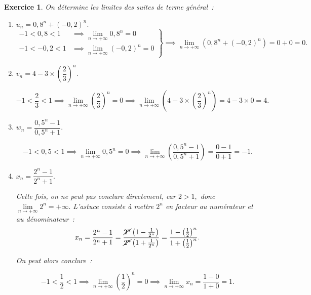 \documentclass[10pt]{article}
\newtheorem{exo}{Exercice}
\begin{document}
\begin{exo}

On détermine les limites des suites de terme général~:

\begin{enumerate}
\item $u_n=0,8^n+(-0,2)^n.$
\[
\left.
    \begin{array}{ll}
        -1<0,8<1&\implies \lim\limits_{n\to +\infty} 0,8^n = 0 \\
        -1<-0,2<1&\implies \lim\limits_{n\to +\infty} (-0,2)^n = 0
    \end{array}
\right \}\implies \lim\limits_{n\to +\infty}\left(0,8^n+(-0,2)^n\right)=0+0=0.
\]

\item $v_n=4-3\times \left(\dfrac{2}{3}\right)^n.$

\[-1<\dfrac{2}{3}<1\implies \lim\limits_{n\to +\infty} \left(\dfrac{2}{3}\right)^n = 0\implies \lim\limits_{n\to +\infty} \left(4-3\times \left(\dfrac{2}{3}\right)^n\right)=4-3\times 0=4.\]
\item $w_n=\dfrac{0,5^n-1}{0,5^n+1}.$

\[-1<0,5<1\implies \lim\limits_{n\to +\infty} 0,5^n = 0\implies \lim\limits_{n\to +\infty} \left(\dfrac{0,5^n-1}{0,5^n+1}\right)=\dfrac{0-1}{0+1}=-1.\]
\item $x_n=\dfrac{2^n-1}{2^n+1}.$

\medskip

Cette fois, on ne peut pas conclure directement, car $2>1,$ donc $\lim\limits_{n\to +\infty} 2^n=+\infty.$ L'astuce consiste à mettre $2^n$ en facteur au numérateur et au dénominateur~:
\[x_n=\dfrac{2^n-1}{2^n+1}=\dfrac{\cancel{2^n}\left(1-\frac{1}{2^n}\right)}{\cancel{2^n}\left(1+\frac{1}{2^n}\right)}=\dfrac{1-\left(\frac{1}{2}\right)^n}{1+\left(\frac{1}{2}\right)^n}.\]

On peut alors conclure~:

\[-1<\dfrac{1}{2}<1\implies \lim\limits_{n\to +\infty} \left(\dfrac{1}{2}\right)^n = 0\implies \lim\limits_{n\to +\infty} x_n=\frac{1-0}{1+0}=1.\]

\end{enumerate}

\end{exo}
\end{document}
